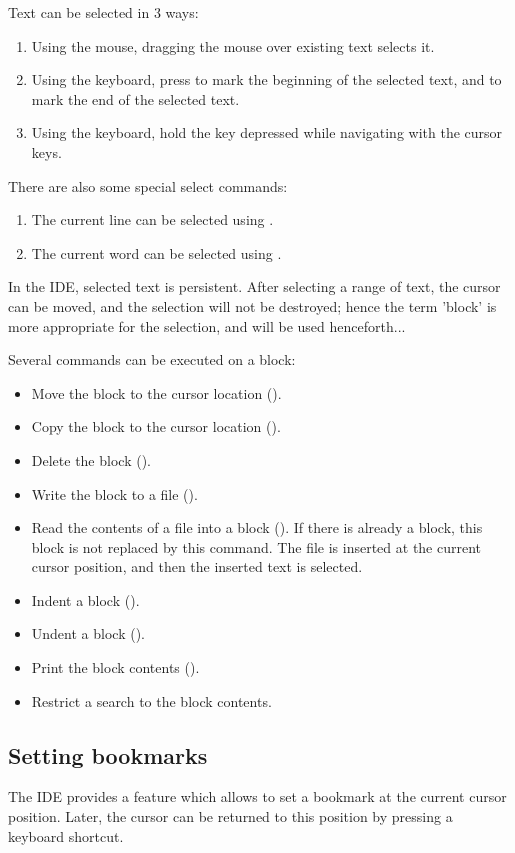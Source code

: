 Text can be selected in 3 ways:
\begin{enumerate}
\item Using the mouse, dragging the mouse over existing text selects it.
\item Using the keyboard, press  to mark the beginning of
the selected text, and  to mark the end of the selected
text.
\item Using the keyboard, hold the  key depressed while
navigating with the cursor keys.
\end{enumerate}

There are also some special select commands:
\begin{enumerate}
\item The current line can be selected using .
\item The current word can be selected using .
\end{enumerate}

In the \fpc IDE, selected text is persistent. After selecting a range of 
text, the cursor can be moved, and the selection will not be destroyed;
hence the term 'block' is more appropriate for the selection, and will be
used henceforth...

Several commands can be executed on a block:
\begin{itemize}
\item Move the block to the cursor location ().
\item Copy the block to the cursor location ().
\item Delete the block ().
\item Write the block to a file ().
\item Read the contents of a file into a block ().
If there is already a block, this block is not replaced by this command.
The file is inserted at the current cursor position, and then the
inserted text is selected.
\item Indent a block ().
\item Undent a block ().
\item Print the block contents ().
\item Restrict a search to the block contents.
\end{itemize}

%
%
\subsection{Setting bookmarks}
\label{se:bookmarks}
The IDE provides a feature which allows to set a bookmark at the current 
cursor position. Later, the cursor can be returned to this position 
by pressing a keyboard shortcut.


